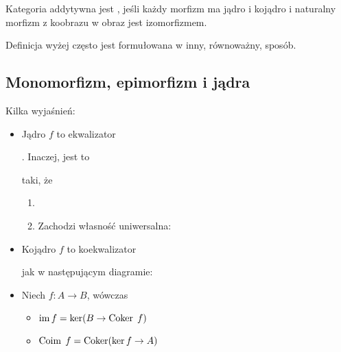 \begin{definition}
  Kategoria addytywna jest , jeśli każdy morfizm ma jądro i kojądro i naturalny morfizm z koobrazu w obraz jest izomorfizmem.
\end{definition}

Definicja wyżej często jest formułowana w inny, równoważny, sposób.

\subsection{Monomorfizm, epimorfizm i jądra}

\begin{definition}
  Kilka wyjaśnień:
\begin{itemize}
  \item Jądro $f$ to ekwalizator . Inaczej, jest to  taki, że
    \begin{enumerate}
      \item {}
      \item Zachodzi własność uniwersalna:
        \begin{center}\end{center}
    \end{enumerate}
  \item Kojądro $f$ to koekwalizator  jak w następującym diagramie:
    \begin{center}\end{center}
  \item Niech $f:A\to B$, wówczas
    \begin{itemize}
      \item $\operatorname{im} f=\ker(B\to \operatorname{Coker}\;f)$
      \item $\operatorname{Coim}\;f=\operatorname{Coker}(\ker f\to A)$
    \end{itemize}


\end{itemize}
\end{definition}
